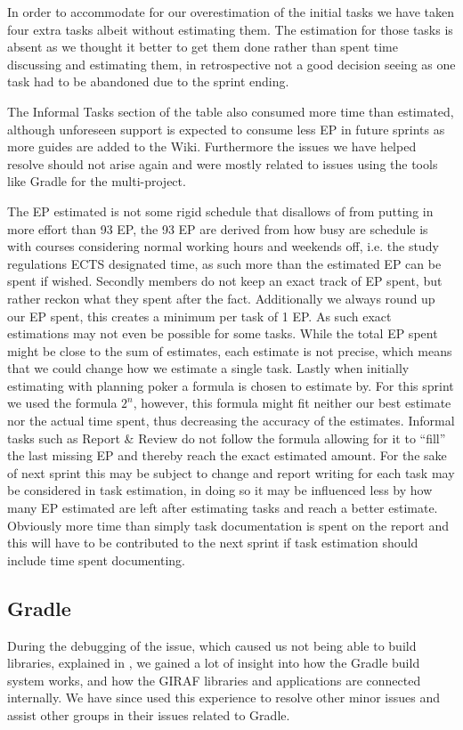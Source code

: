 In order to accommodate for our overestimation of the initial tasks we have taken four extra tasks albeit without estimating them.
The estimation for those tasks is absent as we thought it better to get them done rather than spent time discussing and estimating them, in retrospective not a good decision seeing as one task had to be abandoned due to the sprint ending.

The Informal Tasks section of the table also consumed more time than estimated, although unforeseen support is expected to consume less EP in future sprints as more guides are added to the Wiki.
Furthermore the issues we have helped resolve should not arise again and were mostly related to issues using the tools like Gradle for the multi-project.

The EP estimated is not some rigid schedule that disallows of from putting in more effort than 93 EP, the 93 EP are derived from how busy are schedule is with courses considering normal working hours and weekends off, i.e. the study regulations ECTS designated time, as such more than the estimated EP can be spent if wished.
Secondly members do not keep an exact track of EP spent, but rather reckon what they spent after the fact.
Additionally we always round up our EP spent, this creates a minimum per task of 1 EP.
As such exact estimations may not even be possible for some tasks.
While the total EP spent might be close to the sum of estimates, each estimate is not precise, which means that we could change how we estimate a single task.
Lastly when initially estimating with planning poker a formula is chosen to estimate by.
For this sprint we used the formula $2^n$, however, this formula might fit neither our best estimate nor the actual time spent, thus decreasing the accuracy of the estimates.
Informal tasks such as Report \& Review do not follow the formula allowing for it to \enquote{fill} the last missing EP and thereby reach the exact estimated amount.
For the sake of next sprint this may be subject to change and report writing for each task may be considered in task estimation, in doing so it may be influenced less by how many EP estimated are left after estimating tasks and reach a better estimate.
Obviously more time than simply task documentation is spent on the report and this will have to be contributed to the next sprint if task estimation should include time spent documenting.

\subsection{Gradle}
During the debugging of the issue, which caused us not being able to build libraries, explained in , we gained a lot of insight into how the Gradle build system works, and how the GIRAF libraries and applications are connected internally.
We have since used this experience to resolve other minor issues and assist other groups in their issues related to Gradle.

